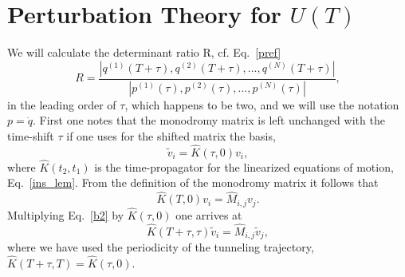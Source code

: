 \documentclass[journal=jpcafh,manuscript=article]{achemso}
\begin{document}
\setcounter{equation}{0}
\section{Perturbation Theory for $U(T)$}

We will calculate the determinant ratio R, cf. Eq.~\ref{pref}
\begin{equation}
  \label{ratio}
  R = \frac{|q^{(1)}(T+\tau),q^{(2)}(T+\tau),...,q^{(N)}(T+\tau)|}{|p^{(1)}(\tau),p^{(2)}(\tau),...,p^{(N)}(\tau)|},
\end{equation}
in the leading order of $\tau$, which happens to be two, and we will use the
notation $p=\dot{q}$. First one notes that the monodromy matrix is left
unchanged with the time-shift $\tau$ if one uses for the shifted
matrix the basis,
\begin{equation}
  \label{b1}
\tilde{v}_i=\hat{K}(\tau,0)v_i,
\end{equation}
where $\hat{K}(t_2,t_1)$ is the time-propagator for the linearized
equations of motion, Eq.~\ref{ins_lem}. From the definition of the
monodromy matrix it follows that
\begin{equation}
  \label{b2}
  \hat{K}(T,0)v_i=\hat{M}_{i,j}v_j.
\end{equation}
Multiplying Eq.~\ref{b2} by $\hat{K}(\tau,0)$ one arrives at
\begin{equation}
  \label{b3}
  \hat{K}(T+\tau,\tau)\tilde{v}_i=\hat{M}_{i,j}\tilde{v}_j,
\end{equation}
where we have used the periodicity of the tunneling trajectory, $\hat{K}(T+\tau,T)=\hat{K}(\tau,0)$.
\end{document}
